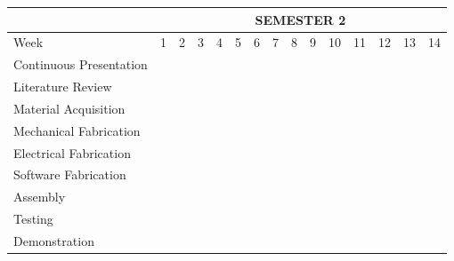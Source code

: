 \begin{table}[H]
  \begin{center}
    \leavevmode
{}
\begin{tabular}{|l|c|c|c|c|c|c|c|c|c|c|c|c|c|c|} \hline
& \multicolumn{14}{c|}{SEMESTER 2} \\ \hline
\rowcolor{white} Week & 1 & 2 & 3 & 4 & 5 & 6 & 7 & 8 & 9 & 10 & 11 & 12 & 13 & 14 \\ \hline
\rowcolor{white} Continuous Presentation & \cellcolor{black} & \cellcolor{black} & \cellcolor{black} & \cellcolor{black} & \cellcolor{black} & \cellcolor{black} & \cellcolor{black} & \cellcolor{black} & \cellcolor{black} & & & & & \\ \hline
\rowcolor{white} Literature Review & \cellcolor{black} & \cellcolor{black} & \cellcolor{black} & \cellcolor{black} & \cellcolor{black} & & & & & & & & & \\ \hline
\rowcolor{white} Material Acquisition & \cellcolor{black} & \cellcolor{black} & & & & & & & & & & & & \\ \hline
\rowcolor{white} Mechanical Fabrication & & \cellcolor{black} & \cellcolor{black} & \cellcolor{black} & \cellcolor{black} & & & & & & & & & \\ \hline
\rowcolor{white} Electrical Fabrication & & & \cellcolor{black} & \cellcolor{black} & \cellcolor{black} & \cellcolor{black} & & & & & & & & \\ \hline
\rowcolor{white} Software Fabrication & & & & \cellcolor{black} & \cellcolor{black} & \cellcolor{black} & \cellcolor{black} & \cellcolor{black} & \cellcolor{black} & & & & & \\ \hline

\rowcolor{white} Assembly & & & & & & \cellcolor{black} & \cellcolor{black} & \cellcolor{black} & \cellcolor{black} & \cellcolor{black} & & & & \\ \hline
\rowcolor{white} Testing & & & & & & \cellcolor{black} & \cellcolor{black} & \cellcolor{black} & \cellcolor{black} & \cellcolor{black} & \cellcolor{black} & \cellcolor{black} & & \\ \hline
\rowcolor{white} Demonstration & & & & & & & & & & \cellcolor{black} & \cellcolor{black} & \cellcolor{black} & \cellcolor{black} & \cellcolor{black} \\ \hline
\end{tabular}

\label{table:semester2timeplan}
\end{center}
\end{table}

